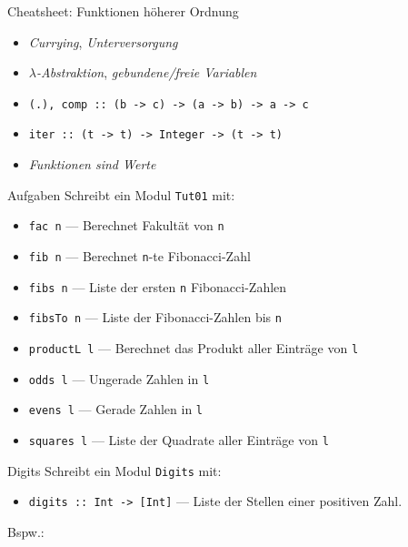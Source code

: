 \documentclass{beamer}
\begin{document}
\begin{frame}{Cheatsheet: Funktionen höherer Ordnung}
        \begin{itemize}
          \item \emph{Currying}, \emph{Unterversorgung}
          \item \emph{$\lambda$-Abstraktion}, \emph{gebundene/freie Variablen}
          \item \texttt{(.), comp :: (b -> c) -> (a -> b) -> a -> c}
          \item \texttt{iter :: (t -> t) -> Integer -> (t -> t)}
          \item \emph{Funktionen sind Werte}
        \end{itemize}
\end{frame}

\begin{frame}{Aufgaben}
        Schreibt ein Modul \texttt{Tut01} mit:

        \begin{itemize}
                \item \texttt{fac n} --- Berechnet Fakultät von \texttt{n}
                \item \texttt{fib n} --- Berechnet \texttt{n}-te Fibonacci-Zahl
                \item \texttt{fibs n} --- Liste der ersten \texttt{n} Fibonacci-Zahlen
                \item \texttt{fibsTo n} --- Liste der Fibonacci-Zahlen bis \texttt{n}
                \item \texttt{productL l} --- Berechnet das Produkt aller Einträge von \texttt{l}
                \item \texttt{odds l} --- Ungerade Zahlen in \texttt{l}
                \item \texttt{evens l} --- Gerade Zahlen in \texttt{l}
                \item \texttt{squares l} --- Liste der Quadrate aller Einträge von \texttt{l}
        \end{itemize}
\end{frame}

\begin{frame}{Digits}
  Schreibt ein Modul \texttt{Digits} mit:

  \begin{itemize}
    \item \texttt{digits :: Int -> [Int]} --- Liste der Stellen einer positiven Zahl.
  \end{itemize}

  Bspw.:

\end{frame}
\end{document}
